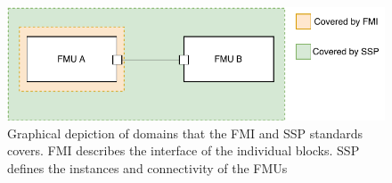 \begin{figure}[bt]
\centering
\includegraphics[width=0.8\columnwidth]{Images/fmi_vs_ssp.pdf}
\caption{Graphical depiction of domains that the FMI and SSP standards covers.
FMI describes the interface of the individual blocks. SSP defines the instances and connectivity of the FMUs}
\label{fig:fmi_vs_ssp}
\end{figure}
